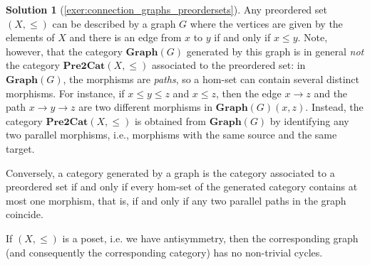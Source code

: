 \documentclass[a4paper,11pt, oneside,titlepage=false]{scrbook}
\theoremstyle{plain}
\theoremstyle{definition}
\newtheorem{solution}[thm]{Solution}
\newcommand{\Catb}[1]{\mathbf{#1}}
\newcommand{\PREtoCAT}{\Catb{Pre2Cat}}
\newcommand{\CHom}[3]{{#1}(#2,#3)}
\begin{document}
\begin{solution}[\cref{exer:connection_graphs_preordersets}]\label{sol:connection_graphs_preordersets}
Any preordered set $(X,\leq)$ can be described by a graph $G$ where the vertices are
given by the elements of $X$ and there is an edge from $x$ to $y$ if and only if
$x \leq y$.
Note, however, that the category $\mathbf{Graph}(G)$ generated by this graph is in
general \emph{not} the category $\PREtoCAT(X,\leq)$ associated to the preordered set:
in $\mathbf{Graph}(G)$, the morphisms are \emph{paths}, so a hom-set can contain
several distinct morphisms. For instance, if $x \leq y \leq z$ and $x \leq z$, then
the edge $x \to z$ and the path $x \to y \to z$ are two different morphisms in
$\CHom{\mathbf{Graph}(G)}{x}{z}$.
Instead, the category $\PREtoCAT(X,\leq)$ is obtained from $\mathbf{Graph}(G)$ by
identifying any two parallel morphisms, i.e., morphisms with the same source and
the same target.

Conversely, a category generated by a graph is the category associated to a
preordered set if and only if every hom-set of the generated category contains at
most one morphism, that is, if and only if any two parallel paths in the graph
coincide.

If $(X,\leq)$ is a poset, i.e. we have antisymmetry, then the corresponding graph
(and consequently the corresponding category) has no non-trivial cycles.
\end{solution}
\end{document}
